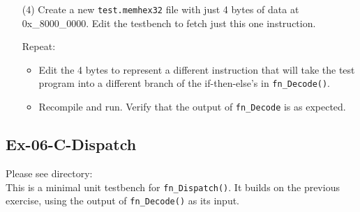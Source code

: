 \begin{itemize}
\item[(4)] Create a new \verb|test.memhex32| file with just 4 bytes of
    data at 0x\_8000\_0000.  Edit the testbench to fetch just this one
    instruction.

    Repeat:
    \begin{itemize}

    \item Edit the 4 bytes to represent a different instruction that
      will take the test program into a different branch of the
      if-then-else's in \verb|fn_Decode()|.

    \item Recompile and run. Verify that the output of
      \verb|fn_Decode| is as expected.

    \end{itemize}

\end{itemize}


\subsection*{Ex-06-C-Dispatch}
\label{Ex-06-C-Dispatch}

Please see directory:  \\
This is a minimal unit testbench for \verb|fn_Dispatch()|.  It builds
on the previous exercise, using the output of \verb|fn_Decode()| as
its input.

